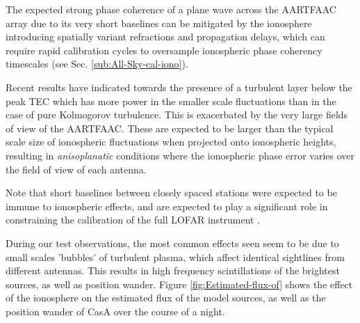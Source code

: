 \documentclass{aa}
\begin{document}
The expected  strong phase coherence of  a plane wave across  the AARTFAAC array
due to its  very short baselines can be mitigated  by the ionosphere introducing
spatially variant  refractions and propagation  delays, which can  require rapid
calibration  cycles to  oversample ionospheric  phase coherency  timescales (see
Sec. \ref{sub:All-Sky-cal-iono}).

Recent  results \citep{intema2009ionospheric} have  indicated towards
the presence of a turbulent layer below the peak TEC which has more power in the
smaller scale fluctuations than in the case of pure Kolmogorov turbulence.  This
is exacerbated  by the  very large fields  of view  of the AARTFAAC.   These are
expected to  be larger than the  typical scale size  of ionospheric fluctuations
when  projected  onto  ionospheric  heights,  resulting  in  \emph{anisoplanatic
}conditions where the  ionospheric phase error varies over the  field of view of
each antenna.

Note that  short baselines between closely  spaced stations were  expected to be
immune to  ionospheric effects, and are  expected to play a  significant role in
constraining    the     calibration    of    the     full    LOFAR    instrument
\citep{vdTol2007selfcallofar}.

During our  test observations, the  most common effects  seen seem to be  due to
small scales  'bubbles' of turbulent  plasma, which affect  identical sightlines
from different antennas.   This results in high frequency  scintillations of the
brightest     sources,     as    well     as     position    wander.      Figure
\ref{fig:Estimated-flux-of} shows the effect  of the ionosphere on the estimated
flux of  the model  sources, as  well as the  position wander  of CasA  over the
course of a night.
\end{document}
